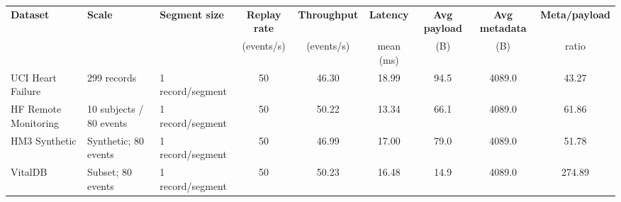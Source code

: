 \begin{tabular}{|l|l|l|c|c|c|c|c|c|}
\hline
\textbf{Dataset} & \textbf{Scale} & \textbf{Segment size} & \textbf{Replay rate} & \textbf{Throughput} & \textbf{Latency} & \textbf{Avg payload} & \textbf{Avg metadata} & \textbf{Meta/payload} \\
 &  &  & (events/s) & (events/s) & mean (ms) & (B) & (B) & ratio \\
\hline
UCI Heart Failure & 299 records & 1 record/segment & 50 & 46.30 & 18.99 & 94.5 & 4089.0 & 43.27 \\
HF Remote Monitoring & 10 subjects / 80 events & 1 record/segment & 50 & 50.22 & 13.34 & 66.1 & 4089.0 & 61.86 \\
HM3 Synthetic & Synthetic; 80 events & 1 record/segment & 50 & 46.99 & 17.00 & 79.0 & 4089.0 & 51.78 \\
VitalDB & Subset; 80 events & 1 record/segment & 50 & 50.23 & 16.48 & 14.9 & 4089.0 & 274.89 \\
\hline
\end{tabular}
